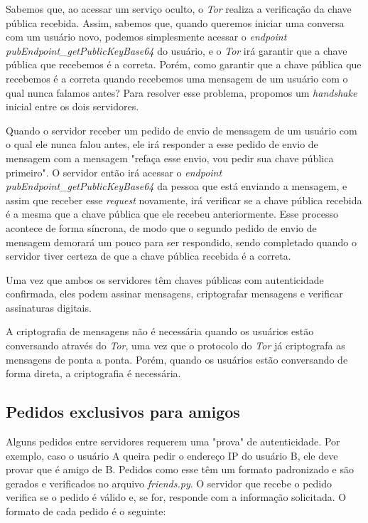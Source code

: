 Sabemos que, ao acessar um serviço oculto, o \textit{Tor} realiza a verificação da chave pública recebida. Assim, sabemos que, quando queremos iniciar uma conversa com um usuário novo, podemos simplesmente acessar o \textit{endpoint} \textit{pubEndpoint\_getPublicKeyBase64} do usuário, e o \textit{Tor} irá garantir que a chave pública que recebemos é a correta. Porém, como garantir que a chave pública que recebemos é a correta quando recebemos uma mensagem de um usuário com o qual nunca falamos antes? Para resolver esse problema, propomos um \textit{handshake} inicial entre os dois servidores.

Quando o servidor receber um pedido de envio de mensagem de um usuário com o qual ele nunca falou antes, ele irá responder a esse pedido de envio de mensagem com a mensagem "refaça esse envio, vou pedir sua chave pública primeiro". O servidor então irá acessar o \textit{endpoint} \textit{pubEndpoint\_getPublicKeyBase64} da pessoa que está enviando a mensagem, e assim que receber esse \textit{request} novamente, irá verificar se a chave pública recebida é a mesma que a chave pública que ele recebeu anteriormente. Esse processo acontece de forma síncrona, de modo que o segundo pedido de envio de mensagem demorará um pouco para ser respondido, sendo completado quando o servidor tiver certeza de que a chave pública recebida é a correta.

Uma vez que ambos os servidores têm chaves públicas com autenticidade confirmada, eles podem assinar mensagens, criptografar mensagens e verificar assinaturas digitais.

A criptografia de mensagens não é necessária quando os usuários estão conversando através do \textit{Tor}, uma vez que o protocolo do \textit{Tor} já criptografa as mensagens de ponta a ponta. Porém, quando os usuários estão conversando de forma direta, a criptografia é necessária.

\subsection{Pedidos exclusivos para amigos}

Alguns pedidos entre servidores requerem uma "prova" de autenticidade. Por exemplo, caso o usuário A queira pedir o endereço IP do usuário B, ele deve provar que é amigo de B. Pedidos como esse têm um formato padronizado e são gerados e verificados no arquivo \textit{friends.py}. O servidor que recebe o pedido verifica se o pedido é válido e, se for, responde com a informação solicitada. O formato de cada pedido é o seguinte:


